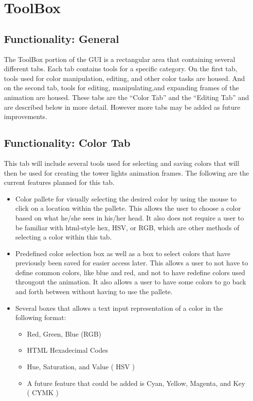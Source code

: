 \documentclass{article}
\begin{document}
	\section{ToolBox} \label{toolbox}
	
	\subsection{Functionality: General}
	The ToolBox portion of the GUI is a rectangular area that containing several different tabs. Each tab contains tools for a specific category.  On the first tab, tools used for color manipulation, editing, and other color tasks are housed.  And on the second tab, tools for editing, manipulating,and expanding frames of the animation are housed. These tabs are the “Color Tab” and the “Editing Tab” and are described below in more detail. However more tabs may be added as future improvements.
	\subsection{Functionality: Color Tab}
This tab will include several tools used for selecting and saving colors that will then be used for creating the tower lights animation frames. The following are the current features planned for this tab.
	\begin{itemize}
			\item Color pallete for visually selecting the desired color by using the mouse to click on a location within the pallete.  This allows the user to choose a color based on what he/she sees in his/her head.  It also does not require a user to be familiar with html-style hex, HSV, or RGB, which are other methods of selecting a color within this tab.  
			\item Predefined color selection box as well as a box to select colors that have previously been saved for easier access later.  This allows a user to not have to define common colors, like blue and red, and not to have redefine colors used througout the animation.  It also allows a user to have some colors to go back and forth between without having to use the pallete.
			\item Several  boxes that allows a text input representation of a color in the following format:
		\begin{itemize}
				\item Red, Green, Blue (RGB)
				\item HTML Hexadecimal Codes
				\item Hue, Saturation, and Value ( HSV )
				\item A future feature that could be added is Cyan, Yellow, Magenta, and Key ( CYMK )
		\end{itemize}
	\end{itemize}
\end{document}
